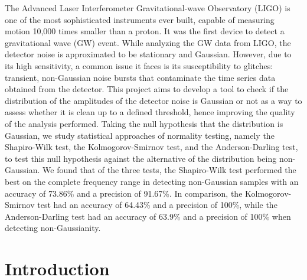 \documentclass[12pt]{article}
\begin{document}
\noindent The Advanced Laser Interferometer Gravitational-wave Observatory (LIGO) is one of the most sophisticated instruments ever built, capable of measuring motion 10,000 times smaller than a proton. It was the first device to detect a gravitational wave (GW) event. While analyzing the GW data from LIGO, the detector noise is approximated to be stationary and Gaussian. However, due to its high sensitivity, a common issue it faces is its susceptibility to glitches: transient, non-Gaussian noise bursts that contaminate the time series data obtained from the detector. This project aims to develop a tool to check if the distribution of the amplitudes of the detector noise is Gaussian or not as a way to assess whether it is clean up to a defined threshold, hence improving the quality of the analysis performed. Taking the null hypothesis that the distribution is Gaussian, we study statistical approaches of normality testing, namely the Shapiro-Wilk test, the Kolmogorov-Smirnov test, and the Anderson-Darling test, to test this null hypothesis against the alternative of the distribution being non-Gaussian. We found that of the three tests, the Shapiro-Wilk test performed the best on the complete frequency range in detecting non-Gaussian samples with an accuracy of 73.86\% and a precision of 91.67\%. In comparison, the Kolmogorov-Smirnov test had an accuracy of 64.43\% and a precision of 100\%, while the Anderson-Darling test had an accuracy of 63.9\% and a precision of 100\% when detecting non-Gaussianity. 


\section{Introduction}\label{Introduction}
\end{document}
